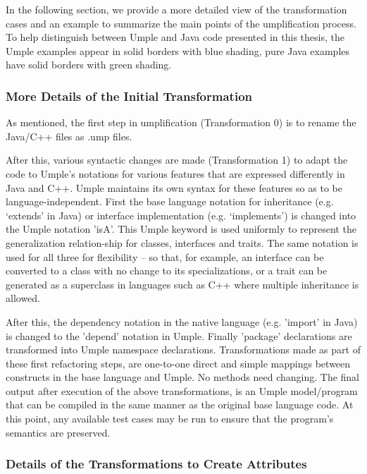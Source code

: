 In the following section, we provide a more detailed view of the transformation cases and an example to summarize the main points of the umplification process. To help distinguish between Umple and Java code presented in this thesis, the Umple examples appear in solid borders with blue shading, pure Java examples have solid borders with green shading. 

\subsubsection{More Details of the Initial Transformation}

As mentioned, the first step in umplification (Transformation 0) is to rename the Java/C++ files as .ump files.

After this, various syntactic changes are made (Transformation 1) to adapt the code to Umple's notations for various features that are expressed differently in Java and C++. Umple maintains its own syntax for these features so as to be language-independent.
First the base language notation for inheritance (e.g. `extends' in Java) or interface implementation (e.g. `implements') is changed into the Umple notation 'isA'. This Umple keyword is used uniformly to represent the generalization relation-ship for classes, interfaces and traits. The same notation is used for all three for flexibility – so that, for example, an interface can be converted to a class with no change to its specializations, or a trait can be generated as a superclass in languages such as C++ where multiple inheritance is allowed.

After this, the dependency notation in the native language (e.g. 'import' in Java) is changed to the 'depend' notation in Umple. Finally 'package' declarations are transformed into Umple namespace declarations. 
Transformations made as part of these first refactoring steps, are one-to-one direct and simple mappings between constructs in the base language and Umple. No methods need changing. The final output after execution of the above transformations, is an Umple model/program that can be compiled in the same manner as the original base language code. At this point, any available test cases may be run to ensure that the program's semantics are preserved.

\subsubsection{Details of the Transformations to Create Attributes}

